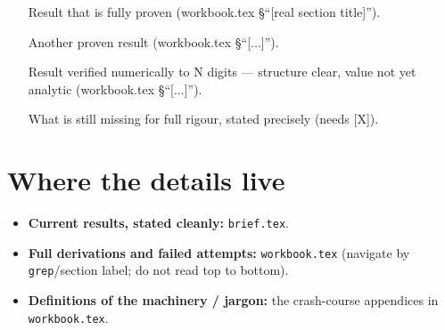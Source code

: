 \documentclass[11pt, a4paper]{article}
\begin{document}
\begin{provenbox}
\begin{itemize}[leftmargin=1.4em, itemsep=3pt]
  \item [Result that is fully proven] \quad(workbook.tex \S``[real section title]'').
  \item [Another proven result] \quad(workbook.tex \S``[...]'').
\end{itemize}
\end{provenbox}

\begin{openbox}
\begin{itemize}[leftmargin=1.4em, itemsep=3pt]
  \item [Result verified numerically to N digits — structure clear, value not yet
        analytic] \quad(workbook.tex \S``[...]'').
  \item [What is still missing for full rigour, stated precisely] \quad(needs [X]).
\end{itemize}
\end{openbox}

\section*{Where the details live}

\begin{itemize}[leftmargin=1.4em, itemsep=2pt]
  \item \textbf{Current results, stated cleanly:} \texttt{brief.tex}.
  \item \textbf{Full derivations and failed attempts:} \texttt{workbook.tex}
        (navigate by \texttt{grep}/section label; do not read top to bottom).
  \item \textbf{Definitions of the machinery / jargon:} the crash-course
        appendices in \texttt{workbook.tex}.
\end{itemize}
\end{document}
